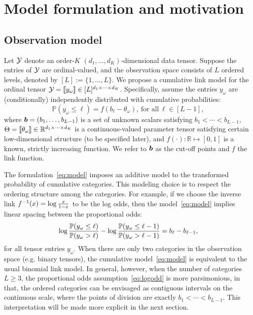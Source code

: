 \documentclass{article}
\theoremstyle{plain}
\theoremstyle{definition}
\begin{document}
\vspace{-.1cm}
\section{Model formulation and motivation}
\vspace{-.1cm}
\subsection{Observation model}
\vspace{-.1cm}
Let $\mathcal{Y}$ denote an order-$K$ $(d_1,\ldots,d_K)$-dimensional data tensor. Suppose the entries of $\mathcal{Y}$ are ordinal-valued, and the observation space consists of $L$ ordered levels, denoted by $[L]:=\{1,\ldots,L\}$. We propose a cumulative link model for the ordinal tensor $\mathcal{Y}=\llbracket y_\omega \rrbracket\in[L]^{d_1\times \cdots\times d_K}$. Specifically, assume the entries $y_\omega$ are (conditionally) independently distributed with cumulative probabilities:
\begin{equation}\label{eq:model}
\mathbb{P}(y_\omega\leq \ell)=f(b_\ell-\theta_\omega),\ \text{for all}\ \ell\in[L-1],
\end{equation}
where $\bm{b}=(b_1,\ldots,b_{L-1})$ is a set of unknown scalars satisfying $b_1<\cdots <b_{L-1}$, $\Theta=\llbracket \theta_\omega \rrbracket\in\mathbb{R}^{d_1\times \cdots \times d_K}$ is a continuous-valued parameter tensor satisfying certain low-dimensional structure (to be specified later), and $f(\cdot):\mathbb{R}\mapsto[0,1]$ is a known, strictly increasing function. We refer to $\bm{b}$ as the cut-off points and $f$ the link function.

The formulation~\eqref{eq:model} imposes an additive model to the transformed probability of cumulative categories. This modeling choice is to respect the ordering structure among the categories. For example, if we choose the inverse link $f^{-1}(x)=\log {x\over 1-x}$ to be the log odds, then the model~\eqref{eq:model} implies linear spacing between the proportional odds:
\begin{equation}\label{eq:logodd}
\log {\mathbb{P}(y_{\omega}\leq \ell) \over \mathbb{P}(y_\omega >  \ell) } - \log {\mathbb{P}(y_{\omega}\leq {\ell-1}) \over \mathbb{P}(y_\omega >  {\ell-1}) } = b_\ell-b_{\ell-1},
\end{equation}
for all tensor entries $y_\omega$. When there are only two categories in the observation space (e.g. binary tensors), the cumulative model~\eqref{eq:model} is equivalent to the usual binomial link model. In general, however, when the number of categories $L\geq 3$, the proportional odds assumption~\eqref{eq:logodd} is more parsimonious, in that, the ordered categories can be envisaged as contiguous intervals on the continuous scale, where the points of division are exactly $b_1<\cdots <b_{L-1}$. This interpretation will be made more explicit in the next section.
\end{document}
